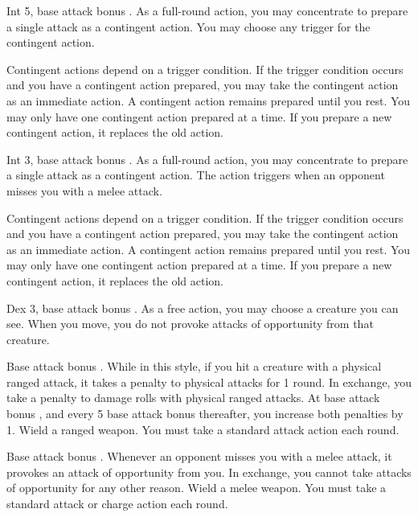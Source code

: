 \featpre Int 5, base attack bonus .
\featben As a full-round action, you may concentrate to prepare a single attack as a contingent action. You may choose any trigger for the contingent action.

Contingent actions depend on a trigger condition. If the trigger condition occurs and you have a contingent action prepared, you may take the contingent action as an immediate action. A contingent action remains prepared until you rest. You may only have one contingent action prepared at a time. If you prepare a new contingent action, it replaces the old action.

\featpre Int 3, base attack bonus .
\featben As a full-round action, you may concentrate to prepare a single attack as a contingent action. The action triggers when an opponent misses you with a melee attack.

Contingent actions depend on a trigger condition. If the trigger condition occurs and you have a contingent action prepared, you may take the contingent action as an immediate action. A contingent action remains prepared until you rest. You may only have one contingent action prepared at a time. If you prepare a new contingent action, it replaces the old action.

 Dex 3, base attack bonus .
 As a free action, you may choose a creature you can see. When you move, you do not provoke attacks of opportunity from that creature.

\featpre Base attack bonus .
 While in this style, if you hit a creature with a physical ranged attack, it takes a  penalty to physical attacks for 1 round. In exchange, you take a  penalty to damage rolls with physical ranged attacks. At base attack bonus , and every 5 base attack bonus thereafter, you increase both penalties by 1.
\stylereq Wield a ranged weapon. You must take a standard attack action each round.

\featpre Base attack bonus .
\featben Whenever an opponent misses you with a melee attack, it provokes an attack of opportunity from you. In exchange, you cannot take attacks of opportunity for any other reason.
\stylereq Wield a melee weapon. You must take a standard attack or charge action each round.


